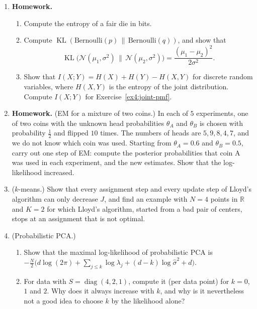 \documentclass[11pt]{article}
\newcommand{\homework}{\textcolor{red!70!black}{\textbf{Homework.}}}
\DeclareMathOperator{\KL}{KL}
\theoremstyle{definition}
\theoremstyle{plain}
\theoremstyle{remark}
\DeclareMathOperator{\diag}{diag}
\begin{document}
\begin{enumerate}[leftmargin=*]
\begin{enumerate}[label=(\alph*)]
        \item Let $f \sim \mathcal{GP}(0, k)$ with $k(s, t) = \min(s, t)$, and observe $f(1) = 1$ without noise. Find the posterior mean and variance of $f(t)$ for $0 \leq t \leq 1$ and for $t > 1$, and sketch them.
    \end{enumerate}
    \item \homework{} \begin{enumerate}[label=(\alph*)]
        \item Compute the entropy of a fair die in bits.
        \item Compute $\KL(\text{Bernoulli}(p) \,\|\, \text{Bernoulli}(q))$, and show that
        \[\KL\big(\mathcal{N}(\mu_1, \sigma^2) \,\|\, \mathcal{N}(\mu_2, \sigma^2)\big) = \frac{(\mu_1 - \mu_2)^2}{2\sigma^2}.\]
        \item Show that $I(X; Y) = H(X) + H(Y) - H(X, Y)$ for discrete random variables, where $H(X, Y)$ is the entropy of the joint distribution. Compute $I(X; Y)$ for Exercise~\ref{ex4:joint-pmf}.
    \end{enumerate}
    \item \homework{} (EM for a mixture of two coins.) In each of $5$ experiments, one of two coins with the unknown head probabilities $\theta_A$ and $\theta_B$ is chosen with probability $\frac{1}{2}$ and flipped $10$ times. The numbers of heads are $5, 9, 8, 4, 7$, and we do not know which coin was used. Starting from $\theta_A = 0.6$ and $\theta_B = 0.5$, carry out one step of EM: compute the posterior probabilities that coin A was used in each experiment, and the new estimates. Show that the log-likelihood increased.
    \item ($k$-means.) Show that every assignment step and every update step of Lloyd's algorithm can only decrease $J$, and find an example with $N = 4$ points in $\mathbb{R}$ and $K = 2$ for which Lloyd's algorithm, started from a bad pair of centers, stops at an assignment that is not optimal.
    \item (Probabilistic PCA.)
    \begin{enumerate}[label=(\alph*)]
        \item Show that the maximal log-likelihood of probabilistic PCA is $-\frac{N}{2}\big(d\log(2\pi) + \sum_{j \leq k}\log\lambda_j + (d - k)\log\hat\sigma^2 + d\big)$.
        \item For data with $S = \diag(4, 2, 1)$, compute it (per data point) for $k = 0$, $1$ and $2$. Why does it always increase with $k$, and why is it nevertheless not a good idea to choose $k$ by the likelihood alone?

\end{enumerate}
\end{enumerate}
\end{document}
